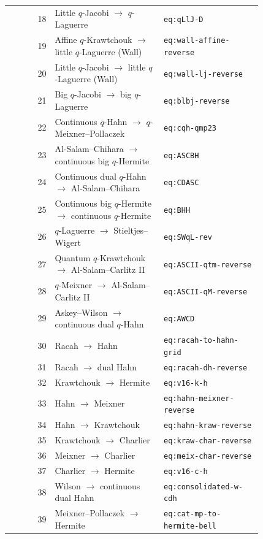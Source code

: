 \documentclass[11pt]{article}
\begin{document}
\begin{center}
\begin{longtable}{@{}r p{0.43\linewidth} p{0.39\linewidth}@{}}
18 & Little $q$-Jacobi $\ensuremath{\to}$ $q$-Laguerre & \texttt{eq:qLlJ-D} \\
19 & Affine $q$-Krawtchouk $\ensuremath{\to}$ little $q$-Laguerre (Wall) & \texttt{eq:wall-affine-reverse} \\
20 & Little $q$-Jacobi $\ensuremath{\to}$ little $q$-Laguerre (Wall) & \texttt{eq:wall-lj-reverse} \\
21 & Big $q$-Jacobi $\ensuremath{\to}$ big $q$-Laguerre & \texttt{eq:blbj-reverse} \\
22 & Continuous $q$-Hahn $\ensuremath{\to}$ $q$-Meixner--Pollaczek & \texttt{eq:cqh-qmp23} \\
23 & Al-Salam--Chihara $\ensuremath{\to}$ continuous big $q$-Hermite & \texttt{eq:ASCBH} \\
24 & Continuous dual $q$-Hahn $\ensuremath{\to}$ Al-Salam--Chihara & \texttt{eq:CDASC} \\
25 & Continuous big $q$-Hermite $\ensuremath{\to}$ continuous $q$-Hermite & \texttt{eq:BHH} \\
26 & $q$-Laguerre $\ensuremath{\to}$ Stieltjes--Wigert & \texttt{eq:SWqL-rev} \\
27 & Quantum $q$-Krawtchouk $\ensuremath{\to}$ Al-Salam--Carlitz II & \texttt{eq:ASCII-qtm-reverse} \\
28 & $q$-Meixner $\ensuremath{\to}$ Al-Salam--Carlitz II & \texttt{eq:ASCII-qM-reverse} \\
29 & Askey--Wilson $\ensuremath{\to}$ continuous dual $q$-Hahn & \texttt{eq:AWCD} \\
30 & Racah $\ensuremath{\to}$ Hahn & \texttt{eq:racah-to-hahn-grid} \\
31 & Racah $\ensuremath{\to}$ dual Hahn & \texttt{eq:racah-dh-reverse} \\
32 & Krawtchouk $\ensuremath{\to}$ Hermite & \texttt{eq:v16-k-h} \\
33 & Hahn $\ensuremath{\to}$ Meixner & \texttt{eq:hahn-meixner-reverse} \\
34 & Hahn $\ensuremath{\to}$ Krawtchouk & \texttt{eq:hahn-kraw-reverse} \\
35 & Krawtchouk $\ensuremath{\to}$ Charlier & \texttt{eq:kraw-char-reverse} \\
36 & Meixner $\ensuremath{\to}$ Charlier & \texttt{eq:meix-char-reverse} \\
37 & Charlier $\to$ Hermite & \texttt{eq:v16-c-h} \\
38 & Wilson $\to$ continuous dual Hahn & \texttt{eq:consolidated-w-cdh} \\
39 & Meixner--Pollaczek $\to$ Hermite & \texttt{eq:cat-mp-to-hermite-bell} \\

\end{longtable}
\end{center}
\end{document}
